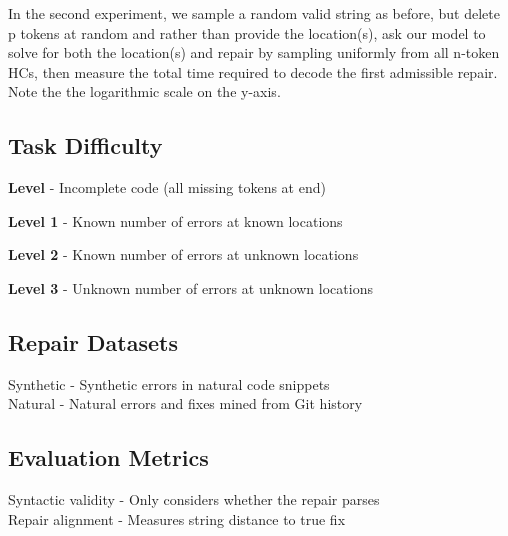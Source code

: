 \documentclass[sigplan,review,anonymous,acmsmall]{acmart}\settopmatter{printfolios=false,printccs=false,printacmref=false}
\begin{document}
\noindent In the second experiment, we sample a random valid string as before, but delete p tokens at random and rather than provide the location(s), ask our model to solve for both the location(s) and repair by sampling uniformly from all n-token HCs, then measure the total time required to decode the first admissible repair. Note the the logarithmic scale on the y-axis.


\subsection{Task Difficulty}

\noindent\textbf{Level \textonehalf} - Incomplete code (all missing tokens at end)

\noindent\textbf{Level 1} - Known number of errors at known locations

\noindent\textbf{Level 2} - Known number of errors at unknown locations

\noindent\textbf{Level 3} - Unknown number of errors at unknown locations

\subsection{Repair Datasets}
Synthetic - Synthetic errors in natural code snippets\\
Natural - Natural errors and fixes mined from Git history
\subsection{Evaluation Metrics}
Syntactic validity - Only considers whether the repair parses\\
Repair alignment - Measures string distance to true fix
\end{document}
